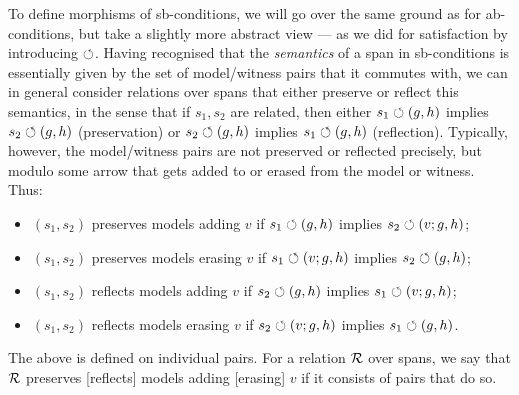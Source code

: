 To define morphisms of sb-conditions, we will go over the same ground as for ab-conditions, but take a slightly more abstract view --- as we did for satisfaction by introducing $\circlearrowleft$. Having recognised that the \emph{semantics} of a span in sb-conditions is essentially given by the set of model/witness pairs that it commutes with, we can in general consider relations over spans that either preserve or reflect this semantics, in the sense that if $s_1,s_2$ are related, then either $s_1\circlearrowleft (g,h)$ implies $s_2\circlearrowleft (g,h)$ (preservation) or $s_2\circlearrowleft (g,h)$ implies $s_1\circlearrowleft (g,h)$ (reflection). Typically, however, the model/witness pairs are not preserved or reflected precisely, but modulo some arrow that gets added to or erased from the model or witness. Thus:
%
\begin{itemize}
\item $(s_1,s_2)$ preserves models adding $v$ if $s_1\circlearrowleft (g,h)$ implies $s_2\circlearrowleft (v;g,h)$;
\item $(s_1,s_2)$ preserves models erasing $v$ if $s_1\circlearrowleft (v;g,h)$ implies $s_2\circlearrowleft (g,h)$;
\item $(s_1,s_2)$ reflects models adding $v$ if $s_2\circlearrowleft (g,h)$ implies $s_1\circlearrowleft (v;g,h)$;
\item $(s_1,s_2)$ reflects models erasing $v$ if $s_2\circlearrowleft (v;g,h)$ implies $s_1\circlearrowleft (g,h)$.
\end{itemize}
%
The above is defined on individual pairs. For a relation $\mathcal{R}$ over spans, we say that $\mathcal{R}$ preserves [reflects] models adding [erasing] $v$ if it consists of pairs that do so.

